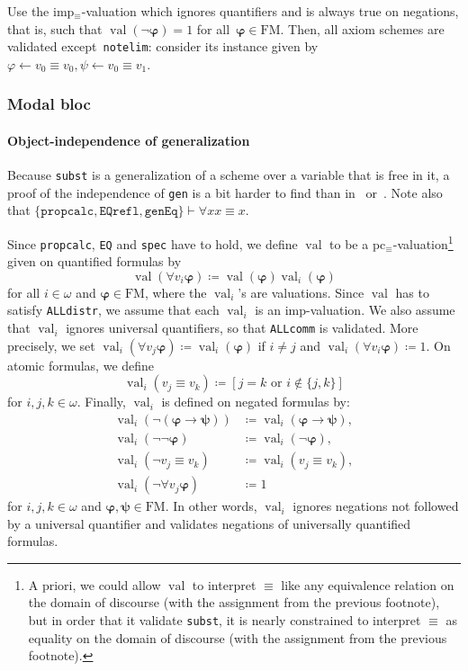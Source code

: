 \documentclass[11pt]{article}
\renewcommand*{\phi}{\varphi}
\newcommand*{\FM}{\mathrm{FM}}
\DeclareMathOperator{\val}{val}
\theoremstyle{plain}
\theoremstyle{definition}
\theoremstyle{remark}
\begin{document}
Use the imp$_\equiv$-valuation which ignores quantifiers and is always true on negations, that is,
such that $\val(\neg \bm\phi) = 1$ for all~$\bm\phi \in \FM$.
Then, all axiom schemes are validated except~\texttt{notelim}: consider its instance given by
$\phi \leftarrow v_0 \equiv v_0, \psi \leftarrow v_0 \equiv v_1$.



\subsubsection{Modal bloc}

\paragraph{Object-independence of generalization}

Because \texttt{subst} is a generalization of a scheme over a variable that is free in it, a proof
of the independence of \texttt{gen} is a bit harder to find than in~\cite{km} or~\cite{monk}.
Note also that $\{\texttt{propcalc}, \texttt{EQrefl}, \texttt{genEq}\} \vdash \forall x x \equiv x$.

Since \texttt{propcalc}, \texttt{EQ} and \texttt{spec} have to hold, we define $\val$ to be a
pc$_\equiv$-valuation\footnote{%
A priori, we could allow $\val$ to interpret $\equiv$ like any equivalence relation on the domain
of discourse (with the assignment from the previous footnote), but in order that it validate
\texttt{subst}, it is nearly constrained to interpret $\equiv$ as equality on the domain of
discourse (with the assignment from the previous footnote).} given on quantified formulas by
\begin{equation}
\val(\forall v_i \bm\phi ) \coloneqq \val(\bm\phi) \val_i(\bm\phi)
\end{equation}
for all $i \in \omega$ and $\bm\phi \in \FM$, where the $\val_i$'s are valuations.
Since $\val$ has to satisfy \texttt{ALLdistr}, we assume that each $\val_i$ is an imp-valuation.
We also assume that $\val_i$ ignores universal quantifiers, so that \texttt{ALLcomm} is validated.
More precisely, we set $\val_i(\forall v_j \bm\phi) \coloneqq \val_i(\bm\phi)$ if $i \neq j$ and
$\val_i(\forall v_i \bm\phi) \coloneqq 1$.
On atomic formulas, we define
\begin{equation}
\val_i(v_j \equiv v_k ) \coloneqq
[j = k \text{ or } i \notin \{j, k\}]
\end{equation}
for $i, j, k \in \omega$.
Finally, $\val_i$ is defined on negated formulas by:
\begin{align*}
\val_i(\neg (\bm\phi \to \bm\psi)) &\coloneqq  \val_i(\bm\phi \to \bm\psi),\\
\val_i(\neg\neg \bm\phi) &\coloneqq  \val_i(\neg \bm\phi),\\
\val_i(\neg v_j\equiv v_k) &\coloneqq  \val_i(v_j\equiv v_k),\\
\val_i(\neg \forall v_j \bm\phi) &\coloneqq 1
\end{align*}
for $i, j, k \in \omega$ and $\bm\phi, \bm\psi \in \FM$.
In other words, $\val_i$ ignores negations not followed by a universal quantifier and validates
negations of universally quantified formulas.
\end{document}
